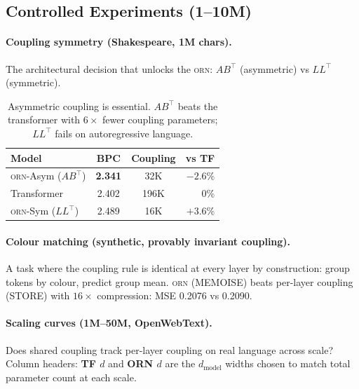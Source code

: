 \documentclass[10pt,twocolumn]{article}
\newcommand{\orn}{\textsc{orn}}
\begin{document}
\subsection{Controlled Experiments (1--10M)}

\paragraph{Coupling symmetry (Shakespeare, 1M chars).}
The architectural decision that unlocks the \orn{}: $AB^\top$ (asymmetric) vs $LL^\top$ (symmetric).

\begin{table}[h]
\centering\small
\begin{tabular}{@{}lccr@{}}
\toprule
\textbf{Model} & \textbf{BPC} & \textbf{Coupling} & \textbf{vs TF} \\
\midrule
\orn{}-Asym ($AB^\top$) & \textbf{2.341} & 32K & $\mathbf{-2.6\%}$ \\
Transformer & 2.402 & 196K & 0\%  \\
\orn{}-Sym ($LL^\top$) & 2.489 & 16K & $+3.6\%$ \\
\bottomrule
\end{tabular}
\caption{Asymmetric coupling is essential. $AB^\top$ beats the transformer with $6\times$ fewer coupling parameters; $LL^\top$ fails on autoregressive language.}
\label{tab:symmetry}
\end{table}

\paragraph{Colour matching (synthetic, provably invariant coupling).}
A task where the coupling rule is identical at every layer by construction: group tokens by colour, predict group mean.
\orn{} (MEMOISE) beats per-layer coupling (STORE) with $16\times$ compression: MSE 0.2076 vs 0.2090.

\paragraph{Scaling curves (1M--50M, OpenWebText).}
Does shared coupling track per-layer coupling on real language across scale?
Column headers: \textbf{TF $d$} and \textbf{ORN $d$} are the $d_\text{model}$ widths chosen to match total parameter count at each scale.
\end{document}

